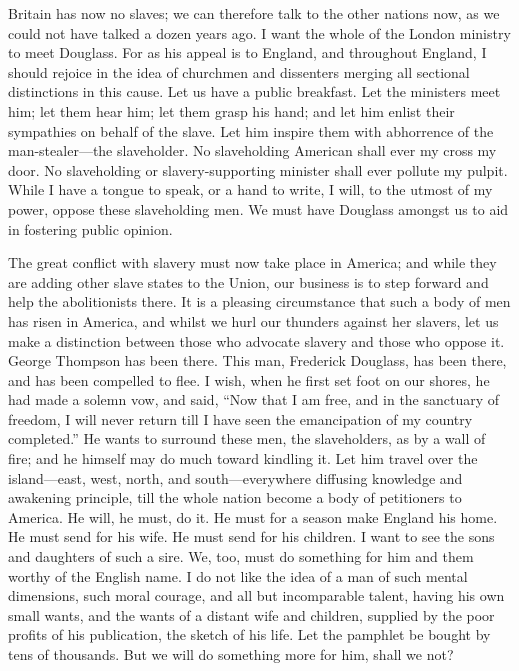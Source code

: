 Britain has now no slaves; we can therefore talk to the other nations
now, as we could not have talked a dozen years ago. I want the whole of
the London ministry to meet Douglass. For as his appeal is to England,
and throughout England, I should rejoice in the
{\protect\hypertarget{420}{}{}}idea of churchmen and dissenters merging
all sectional distinctions in this cause. Let us have a public
breakfast. Let the ministers meet him; let them hear him; let them grasp
his hand; and let him enlist their sympathies on behalf of the slave.
Let him inspire them with abhorrence of the man-stealer---the
slaveholder. No slaveholding American shall ever my cross my door. No
slaveholding or slavery-supporting minister shall ever pollute my
pulpit. While I have a tongue to speak, or a hand to write, I will, to
the utmost of my power, oppose these slaveholding men. We must have
Douglass amongst us to aid in fostering public opinion.

The great conflict with slavery must now take place in America; and
while they are adding other slave states to the Union, our business is
to step forward and help the abolitionists there. It is a pleasing
circumstance that such a body of men has risen in America, and whilst we
hurl our thunders against her slavers, let us make a distinction between
those who advocate slavery and those who oppose it. George Thompson has
been there. This man, Frederick Douglass, has been there, and has been
compelled to flee. I wish, when he first set foot on our shores, he had
made a solemn vow, and said, ``Now that I am free, and in the sanctuary
of freedom, I will never return till I have seen the emancipation of my
country completed.'' He wants to surround these men, the slaveholders,
as by a wall of fire; and he himself may do much toward kindling it. Let
him travel over the island---east, west, north, and south---everywhere
diffusing knowledge and awakening principle, till the whole nation
become a body of petitioners to America. He will, he must, do it. He
must for a season make England his home. He must send for his wife. He
must send for his children. I want to see the sons and daughters of such
a sire. We, too, must do something for him and them worthy of the
English name. I do not like the idea of a man of such mental dimensions,
such moral courage, and all but incomparable talent, having his own
small wants, and the wants of a distant wife and children, supplied by
the poor profits of his publication, the sketch of his life. Let the
pamphlet be bought by tens of thousands. But we will do something more
for him, shall we not?


